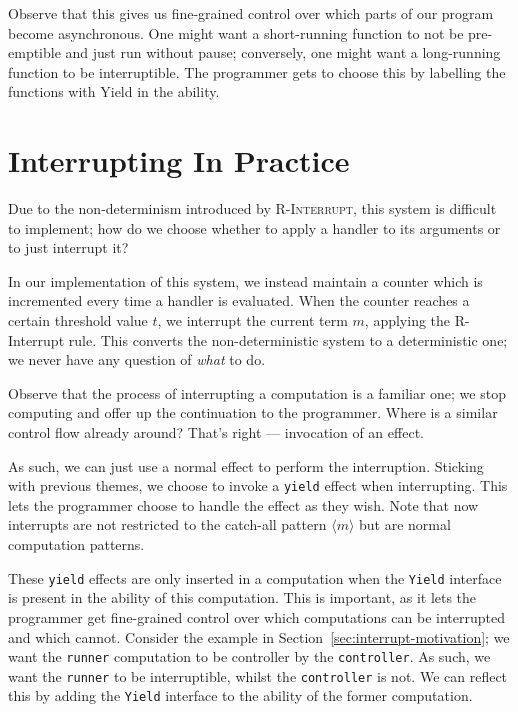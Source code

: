 \documentclass[msc,deptreport,cs]{infthesis} %
\newcommand{\code}[1]{\lstinline{#1}}
\newcommand{\todo}[1]
           {{\par\noindent\small\color{RoyalPurple}
  \framebox{\parbox{\dimexpr\linewidth-2\fboxsep-2\fboxrule}
    {\textbf{TODO:} #1}}}}
\newcommand{\effin}[1]{\langle {#1} \rangle}
\begin{document}
Observe that this gives us fine-grained control over which parts of our program
become asynchronous. One might want a short-running function to not be
pre-emptible and just run without pause; conversely, one might want a
long-running function to be interruptible. The programmer gets to choose this by
labelling the functions with \textsf{Yield} in the ability.



\section{Interrupting In Practice}

Due to the non-determinism introduced by \textsc{R-Interrupt}, this system is
difficult to implement; how do we choose whether to apply a handler to its
arguments or to just interrupt it?

In our implementation of this system, we instead maintain a counter which is
incremented every time a handler is evaluated. When the counter reaches a
certain threshold value $t$, we interrupt the current term $m$, applying the
\textsf{R-Interrupt} rule. This converts the non-deterministic system to a
deterministic one; we never have any question of \emph{what} to do.

Observe that the process of interrupting a computation is a familiar one; we
stop computing and offer up the continuation to the programmer. Where is a
similar control flow already around? That's right --- invocation of an effect.

\todo{Rewrite above paragraph to be less camp}

As such, we can just use a normal effect to perform the interruption. Sticking
with previous themes, we choose to invoke a \code{yield} effect when
interrupting. This lets the programmer choose to handle the effect as they wish.
Note that now interrupts are not restricted to the catch-all pattern $\effin{m}$
but are normal computation patterns.

These \code{yield} effects are only inserted in a computation when the
\code{Yield} interface is present in the ability of this computation. This is
important, as it lets the programmer get fine-grained control over which
computations can be interrupted and which cannot. Consider the example in
Section~\ref{sec:interrupt-motivation}; we want the \code{runner} computation to
be controller by the \code{controller}. As such, we want the \code{runner} to be
interruptible, whilst the \code{controller} is not. We can reflect this by
adding the \code{Yield} interface to the ability of the former computation.
\end{document}
